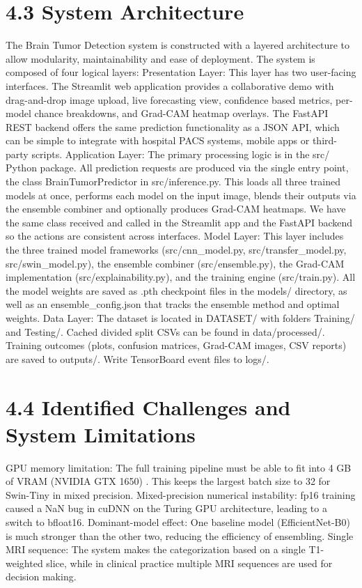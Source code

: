 \documentclass[12pt,a4paper,oneside]{report}
\begin{document}
\section*{4.3 System Architecture}
The Brain Tumor Detection system is constructed with a layered architecture to allow modularity, maintainability and ease of deployment. The system is composed of four logical layers:
Presentation Layer: This layer has two user-facing interfaces. The Streamlit web application provides a collaborative demo with drag-and-drop image upload, live forecasting view, confidence based metrics, per-model chance breakdowns, and Grad-CAM heatmap overlays. The FastAPI REST backend offers the same prediction functionality as a JSON API, which can be simple to integrate with hospital PACS systems, mobile apps or third-party scripts. 
Application Layer: The primary processing logic is in the src/ Python package. All prediction requests are produced via the single entry point, the class BrainTumorPredictor in src/inference.py. This loads all three trained models at once, performs each model on the input image, blends their outputs via the ensemble combiner and optionally produces Grad-CAM heatmaps. We have the same class received and called in the Streamlit app and the FastAPI backend so the actions are consistent across interfaces.
Model Layer: This layer includes the three trained model frameworks (src/cnn\_model.py, src/transfer\_model.py, src/swin\_model.py), the ensemble combiner (src/ensemble.py), the Grad-CAM implementation (src/explainability.py), and the training engine (src/train.py). All the model weights are saved as .pth checkpoint files in the models/ directory, as well as an ensemble\_config.json that tracks the ensemble method and optimal weights.
Data Layer: The dataset is located in DATASET/ with folders Training/ and Testing/. Cached divided split CSVs can be found in data/processed/. Training outcomes (plots, confusion matrices, Grad-CAM images, CSV reports) are saved to outputs/. Write TensorBoard event files to logs/.
\section*{4.4 Identified Challenges and System Limitations}
GPU memory limitation: The full training pipeline must be able to fit into 4 GB of VRAM (NVIDIA GTX 1650) . This keeps the largest batch size to 32 for Swin-Tiny in mixed precision.
Mixed-precision numerical instability: fp16 training caused a NaN bug in cuDNN on the Turing GPU architecture, leading to a switch to bfloat16.
Dominant-model effect: One baseline model (EfficientNet-B0) is much stronger than the other two, reducing the efficiency of ensembling.
Single MRI sequence: The system makes the categorization based on a single T1-weighted slice, while in clinical practice multiple MRI sequences are used for decision making.
\end{document}
